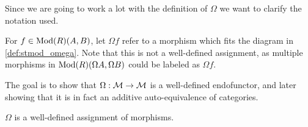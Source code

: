 
Since we are going to work a lot with the definition of \( \Omega \) we want to clarify the notation used.
\begin{notation}
    For \( f \in \operatorname{Mod}(R)(A, B) \), let \( \Omega f \) refer to a morphism which fits the diagram in \autoref{def:stmod_omega}. Note that this is not a well-defined assignment, as multiple morphisms in \( \operatorname{Mod}(R)(\Omega A, \Omega B) \) could be labeled as \( \Omega f \).
\end{notation}

The goal is to show that \( \Omega: {\mathcal{M}} \to {\mathcal{M}} \) is a well-defined endofunctor, and later showing that it is in fact an additive auto-equivalence of categories.

\begin{lemma}
    \label{lem:stmod_omega_f_is_well_defined}
    \( \Omega \) is a well-defined assignment of morphisms.
\end{lemma}
